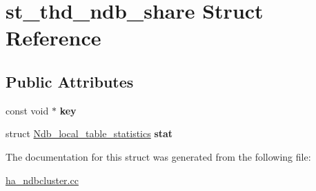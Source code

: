 \hypertarget{structst__thd__ndb__share}{}\section{st\+\_\+thd\+\_\+ndb\+\_\+share Struct Reference}
\label{structst__thd__ndb__share}
\subsection*{Public Attributes}
\begin{DoxyCompactItemize}
\item 
\mbox{\label{structst__thd__ndb__share_adf07bde77512215451eb770ae211df3f}} 
const void $\ast$ {\bfseries key}
\item 
\mbox{\label{structst__thd__ndb__share_a716134588e3a3ca8f9341cf9039bc4f0}} 
struct \mbox{\hyperlink{structNdb__local__table__statistics}{Ndb\+\_\+local\+\_\+table\+\_\+statistics}} {\bfseries stat}
\end{DoxyCompactItemize}


The documentation for this struct was generated from the following file\+:\begin{DoxyCompactItemize}
\item 
\mbox{\hyperlink{ha__ndbcluster_8cc}{ha\+\_\+ndbcluster.\+cc}}\end{DoxyCompactItemize}
